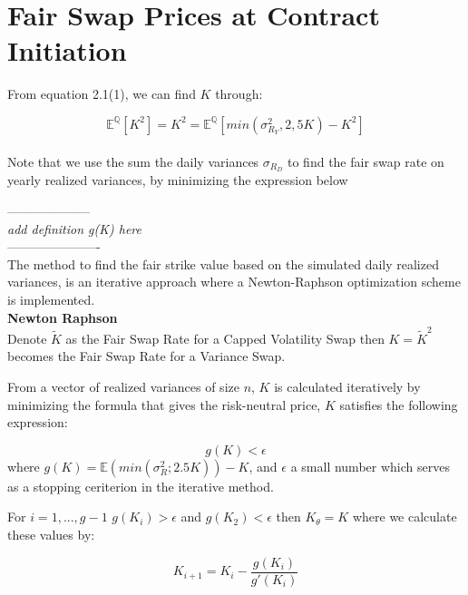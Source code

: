 
\section{Fair Swap Prices at Contract Initiation}


From equation 2.1(1), we can find $K$ through:


     
\begin{equation}
    \mathbb{E}^\mathbb{Q} [K^2] = K^2 = \mathbb{E}^\mathbb{Q} [min(\sigma_{R_{Y}}^2,2,5K)-K^2]
    \label{eq:fair-swap-K}
\end{equation}\\

Note that we use the sum the daily variances $\sigma_{R_{D}}$ to find the fair swap rate on yearly realized variances, by minimizing the expression below

--------------------\\
\textit{add definition g(K) here}\\
----------------------\\

The method to find the fair strike value based on the simulated daily realized variances, is an iterative approach where a Newton-Raphson optimization scheme is implemented. \\

\textbf{Newton Raphson}\\

Denote $\tilde{K}$ as the Fair Swap Rate for a Capped Volatility Swap then $K=\tilde{K}^2$ becomes the Fair Swap Rate for a Variance Swap.

From a vector of realized variances of size $n$, $K$ is calculated iteratively by minimizing the formula that gives the risk-neutral price, $K$ satisfies the following expression:

\begin{equation}
g(K) < \epsilon
\end{equation}
where $g(K) = \mathbb{E}(min(\sigma_{R}^2; 2.5K)) - K$, and $\epsilon$ a small number which serves as a stopping ceriterion in the iterative method.

For $i=1,...,g-1$ \hspace{0.2cm} $g(K_i)>\epsilon$ and $g(K_2)<\epsilon$ then $K_\theta=K$ where we calculate these values by:

\begin{equation}
K_{i+1} = K_i - \frac{g(K_i)}{g'(K_i)} 
\end{equation} 

